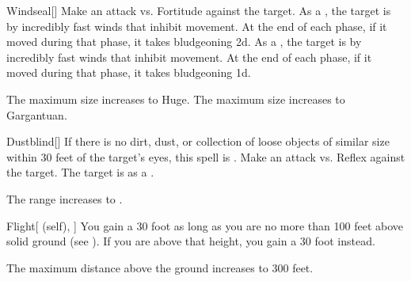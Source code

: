 \lowercase{\hypertarget{spell:Windseal}{}}\label{spell:Windseal}
\begin{freeability}[Rank 4]{\hypertarget{spell:Windseal}{Windseal}}[]
Make an attack vs. Fortitude against the target.
\hit As a , the target is  by incredibly fast winds that inhibit movement.
At the end of each phase, if it moved during that phase, it takes bludgeoning  \minus2d.
\crit As a , the target is  by incredibly fast winds that inhibit movement.
At the end of each phase, if it moved during that phase, it takes bludgeoning  \plus1d.

\rankline
{} The maximum size increases to Huge.
 The maximum size increases to Gargantuan.

\end{freeability}
\vspace{0.25em}



\lowercase{\hypertarget{spell:Dustblind}{}}\label{spell:Dustblind}
\begin{freeability}[Rank 5]{\hypertarget{spell:Dustblind}{Dustblind}}[]
If there is no dirt, dust, or collection of loose objects of similar size within 30 feet of the target's eyes, this spell is .
Make an attack vs. Reflex against the target.
\hit The target is  as a .

\rankline
{} The range increases to \rnglong.

\end{freeability}
\vspace{0.25em}



\lowercase{\hypertarget{spell:Flight}{}}\label{spell:Flight}
\begin{attuneability}[Rank 5]{\hypertarget{spell:Flight}{Flight}}[ (self), ]
You gain a 30 foot  as long as you are no more than 100 feet above solid ground (see ).
If you are above that height, you gain a 30 foot  instead.

\rankline
{} The maximum distance above the ground increases to 300 feet.

\end{attuneability}
\vspace{0.25em}



